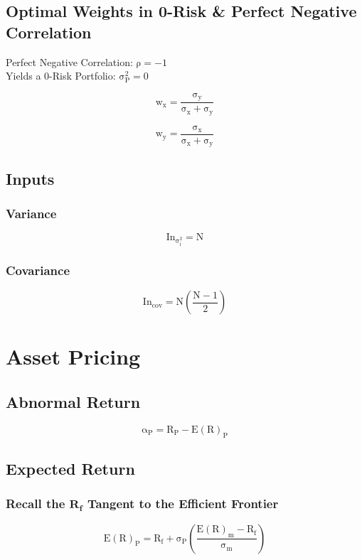 \documentclass[11pt, english]{article}
\begin{document}
	\subsection{Optimal Weights in 0-Risk \& Perfect Negative Correlation}

	Perfect Negative Correlation: $\mathrm{\rho=-1}$\\
	Yields a 0-Risk Portfolio: $\mathrm{\sigma_P^2=0}$

	$$\mathrm{w_x=\frac{\sigma_y}{\sigma_x+\sigma_y}}$$

	$$\mathrm{w_y=\frac{\sigma_x}{\sigma_x+\sigma_y}}$$

	\subsection{Inputs}

		\subsubsection{Variance}

	$$\mathrm{In_{\sigma_i^2}=N}$$

		\subsubsection{Covariance}

	$$\mathrm{In_{cov}=N\left(\frac{N-1}{2}\right)}$$

\newpage

\section{Asset Pricing} 

	\subsection{Abnormal Return}

	$$\mathrm{\alpha_P=R_P-E(R)_P}$$

	\subsection{Expected Return}

		\subsubsection{Recall the $\mathbf{R_f}$ Tangent to the Efficient Frontier} 

	$$\mathrm{E(R)_P=R_f+\sigma_P\left(\frac{E(R)_m-R_f}{\sigma_m}\right)}$$
\end{document}
